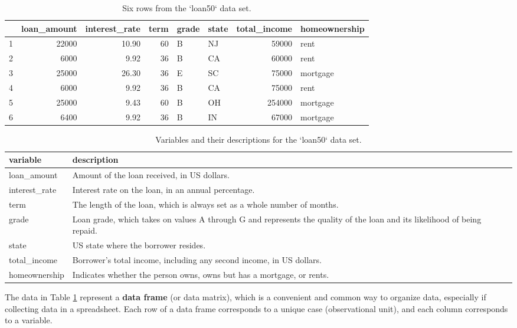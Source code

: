 \documentclass[
  10pt,
  openany]{book}
\theoremstyle{definition}
\theoremstyle{definition}
\theoremstyle{definition}
\theoremstyle{definition}
\theoremstyle{remark}
\begin{document}
\begin{table}

\caption{\label{tab:loan50DF}Six rows from the `loan50` data set.}
\centering
\begin{tabular}[t]{l|r|r|r|l|l|r|l}
\hline
  & loan\_amount & interest\_rate & term & grade & state & total\_income & homeownership\\
\hline
1 & 22000 & 10.90 & 60 & B & NJ & 59000 & rent\\
\hline
2 & 6000 & 9.92 & 36 & B & CA & 60000 & rent\\
\hline
3 & 25000 & 26.30 & 36 & E & SC & 75000 & mortgage\\
\hline
4 & 6000 & 9.92 & 36 & B & CA & 75000 & rent\\
\hline
5 & 25000 & 9.43 & 60 & B & OH & 254000 & mortgage\\
\hline
6 & 6400 & 9.92 & 36 & B & IN & 67000 & mortgage\\
\hline
\end{tabular}
\end{table}

\begin{table}

\caption{\label{tab:loan50Variables}Variables and their descriptions for the `loan50` data set.}
\centering
\begin{tabular}[t]{l|l}
\hline
variable & description\\
\hline
loan\_amount & Amount of the loan received, in US dollars.\\
\hline
interest\_rate & Interest rate on the loan, in an annual percentage.\\
\hline
term & The length of the loan, which is always set as a whole number of months.\\
\hline
grade & Loan grade, which takes on values A through G and represents the quality of the loan and its likelihood of being repaid.\\
\hline
state & US state where the borrower resides.\\
\hline
total\_income & Borrower's total income, including any second income, in US dollars.\\
\hline
homeownership & Indicates whether the person owns, owns but has a mortgage, or rents.\\
\hline
\end{tabular}
\end{table}


The data in Table \ref{tab:loan50DF} represent a \textbf{data frame} (or data matrix), which is a convenient and common way to organize data, especially if collecting data in a spreadsheet.
Each row of a data frame corresponds to a unique case (observational unit), and each column corresponds to a variable.
\end{document}
